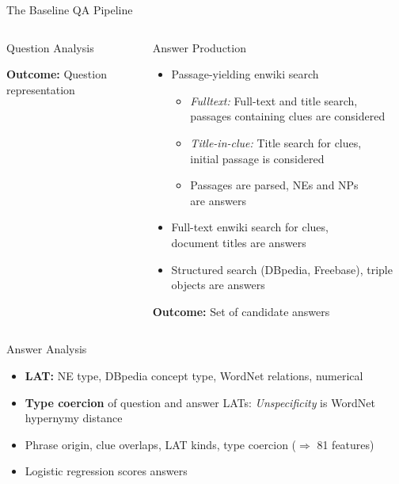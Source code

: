 \documentclass[xcolor=table]{beamer}
\let\olditem\item
\renewcommand\item{\olditem\justifying}
\begin{document}
\begin{frame}[fragile]{}
\begin{columns}[t]
\begin{block}{The Baseline QA Pipeline}
\begin{columns}[t]
\begin{block}{Question Analysis}

	\centering
\colorbox{green!30!white}{\textbf{Outcome:} Question representation}%
\end{block}


\begin{block}{Answer Production}


	\begin{itemize}
		\item Passage-yielding enwiki search
			\begin{itemize}
				\item \textit{Fulltext:} Full-text and title search, \\ \alert{passages containing clues} are considered
				\item \textit{Title-in-clue:} Title search for clues, \\ \alert{initial passage} is considered
				\item Passages are parsed, \alert{NEs and NPs} \\ are answers
			\end{itemize}
		\item Full-text enwiki search for clues, \\ \alert{document titles} are answers
		\item Structured search (DBpedia, Freebase), triple objects are answers
	\end{itemize}

\colorbox{green!30!white}{\textbf{Outcome:} Set of candidate answers}%
\end{block}
      \end{columns}
      \begin{columns}[t]

\begin{block}{Answer Analysis}
      \begin{multicols}{2}
	\begin{itemize}
		\item \textbf{LAT:} NE type, DBpedia concept type, WordNet relations, numerical
		\item \textbf{Type coercion} of question and answer LATs:
			\textit{Unspecificity} is \alert{WordNet} hypernymy distance
		\item Phrase origin, clue overlaps,
			LAT kinds, type coercion ($\Rightarrow$ \alert{81 features})
		\item Logistic regression scores answers
	\end{itemize}


\end{multicols}
\end{block}
\end{columns}
\end{block}
\end{columns}
\end{frame}
\end{document}
